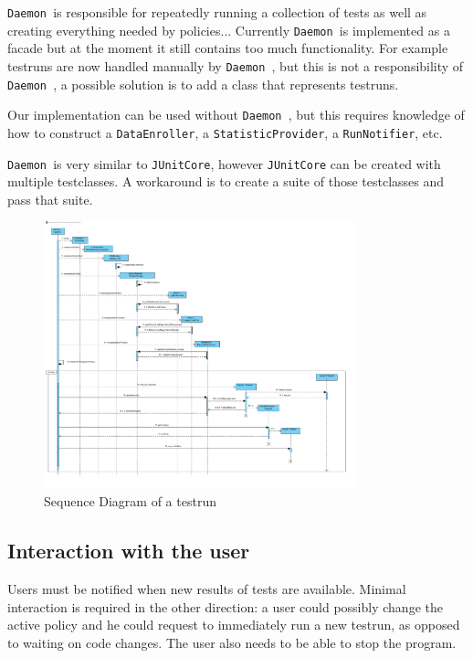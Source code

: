\documentclass[i2]{oss}
\newcommand{\class}[1]{\texttt{#1}}
\newcommand{\Deamon}{\class{Daemon  }}
\begin{document}
\Deamon is responsible for repeatedly running a collection of tests as
well as creating everything needed by policies...
Currently \Deamon is implemented as a facade but at the moment it still
contains too much functionality.
For example testruns are now handled manually by \Deamon, but this is
not a responsibility of \Deamon, a possible solution is to add a class
that represents testruns.

Our implementation can be used without \Deamon, but this requires
knowledge of how to construct a \class{DataEnroller},
a \class{StatisticProvider}, a \class{RunNotifier}, etc.

\Deamon is very similar to \class{JUnitCore}, however \class{JUnitCore}
can be created with multiple testclasses.
A workaround is to create a suite of those testclasses and pass that 
suite.

\begin{figure}[tbp]
\begin{center}
    \includegraphics[width=0.8\textwidth]{RunATestrun}
    \caption{Sequence Diagram of a testrun}
	\label{fig:seq testrun}
\end{center}
\end{figure}




\subsection{Interaction with the user}

Users must be notified when new results of tests are available.
Minimal interaction is required in the other direction: a user could possibly change the active policy and he could request to immediately run a new testrun, as opposed to waiting on code changes.
The user also needs to be able to stop the program.
\end{document}
